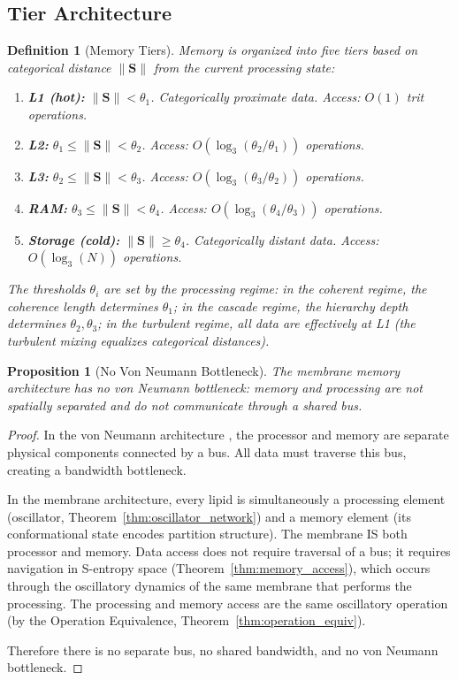\documentclass[twocolumn,10pt]{article}
\newtheorem{proposition}[theorem]{Proposition}
\newtheorem{definition}[theorem]{Definition}
\theoremstyle{remark}
\newcommand{\Scoord}{\mathbf{S}}
\begin{document}
\subsection{Tier Architecture}

\begin{definition}[Memory Tiers]
\label{def:tiers}
Memory is organized into five tiers based on categorical distance $\|\Scoord\|$ from the current processing state:
\begin{enumerate}
\item \textbf{L1 (hot):} $\|\Scoord\| < \theta_1$. Categorically proximate data. Access: $O(1)$ trit operations.
\item \textbf{L2:} $\theta_1 \leq \|\Scoord\| < \theta_2$. Access: $O(\log_3(\theta_2/\theta_1))$ operations.
\item \textbf{L3:} $\theta_2 \leq \|\Scoord\| < \theta_3$. Access: $O(\log_3(\theta_3/\theta_2))$ operations.
\item \textbf{RAM:} $\theta_3 \leq \|\Scoord\| < \theta_4$. Access: $O(\log_3(\theta_4/\theta_3))$ operations.
\item \textbf{Storage (cold):} $\|\Scoord\| \geq \theta_4$. Categorically distant data. Access: $O(\log_3(N))$ operations.
\end{enumerate}
The thresholds $\theta_i$ are set by the processing regime: in the coherent regime, the coherence length determines $\theta_1$; in the cascade regime, the hierarchy depth determines $\theta_2, \theta_3$; in the turbulent regime, all data are effectively at L1 (the turbulent mixing equalizes categorical distances).
\end{definition}

\begin{proposition}[No Von Neumann Bottleneck]
\label{prop:no_vn}
The membrane memory architecture has no von Neumann bottleneck: memory and processing are not spatially separated and do not communicate through a shared bus.
\end{proposition}

\begin{proof}
In the von Neumann architecture \cite{vonneumann1945}, the processor and memory are separate physical components connected by a bus. All data must traverse this bus, creating a bandwidth bottleneck.

In the membrane architecture, every lipid is simultaneously a processing element (oscillator, Theorem~\ref{thm:oscillator_network}) and a memory element (its conformational state encodes partition structure). The membrane IS both processor and memory. Data access does not require traversal of a bus; it requires navigation in S-entropy space (Theorem~\ref{thm:memory_access}), which occurs through the oscillatory dynamics of the same membrane that performs the processing. The processing and memory access are the same oscillatory operation (by the Operation Equivalence, Theorem~\ref{thm:operation_equiv}).

Therefore there is no separate bus, no shared bandwidth, and no von Neumann bottleneck.
\end{proof}
\end{document}
